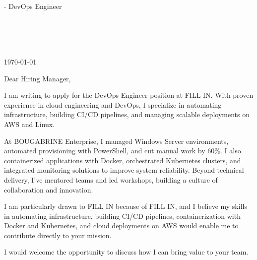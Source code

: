 \documentclass[11pt,a4paper]{article}
\providecommand{\CompanyName}{FILL IN\xspace}
\providecommand{\HiringManager}{Hiring Manager\xspace}
\providecommand{\YourMotivation}{FILL IN\xspace}
\newcommand{\JobTitle}{DevOps Engineer\xspace}
\providecommand{\JobKeywords}{automating infrastructure, building CI/CD pipelines, containerization with Docker and Kubernetes, and cloud deployments on AWS\xspace}
\begin{document}
\begin{flushright}
    {\textbf{\FullName}} - \JobTitle \\
    \Phone \\
    \href{mailto:\Email}{\Email} \\
    \Location \\
    \LinkedIn \\
    \GitHub
\end{flushright}
\vspace{1em}
\today
\vspace{2em}


Dear \HiringManager,

I am writing to apply for the \JobTitle position at \CompanyName. With proven experience in cloud engineering and DevOps, I specialize in automating infrastructure, building CI/CD pipelines, and managing scalable deployments on AWS and Linux.

At BOUGABRINE Enterprise, I managed Windows Server environments, automated provisioning with PowerShell, and cut manual work by 60\%. I also containerized applications with Docker, orchestrated Kubernetes clusters, and integrated monitoring solutions to improve system reliability. Beyond technical delivery, I’ve mentored teams and led workshops, building a culture of collaboration and innovation.

I am particularly drawn to \CompanyName because of \YourMotivation, and I believe my skills in \JobKeywords would enable me to contribute directly to your mission.

I would welcome the opportunity to discuss how I can bring value to your team.

\Signature
\end{document}

